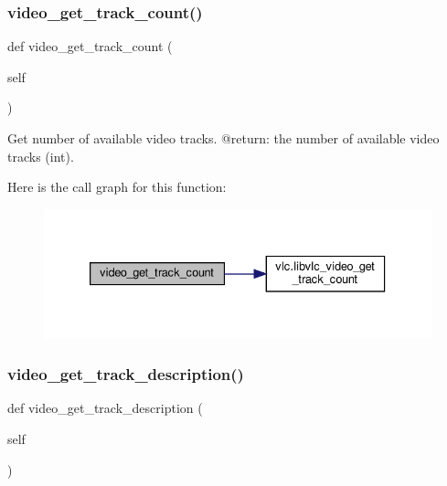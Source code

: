 \subsubsection{\texorpdfstring{video\+\_\+get\+\_\+track\+\_\+count()}{video\_get\_track\_count()}}
{\footnotesize\ttfamily def video\+\_\+get\+\_\+track\+\_\+count (\begin{DoxyParamCaption}\item[{}]{self }\end{DoxyParamCaption})}

\begin{DoxyVerb}Get number of available video tracks.
@return: the number of available video tracks (int).
\end{DoxyVerb}
 Here is the call graph for this function\+:
\nopagebreak
\begin{figure}[H]
\begin{center}
\leavevmode
\includegraphics[width=333pt]{classvlc_1_1_media_player_a2fbaacd793c681e340c5b62022e60f0b_cgraph}
\end{center}
\end{figure}
\mbox{\label{classvlc_1_1_media_player_a93127aa157b1e8d516c2a2dd8c77db21}} 
\subsubsection{\texorpdfstring{video\+\_\+get\+\_\+track\+\_\+description()}{video\_get\_track\_description()}}
{\footnotesize\ttfamily def video\+\_\+get\+\_\+track\+\_\+description (\begin{DoxyParamCaption}\item[{}]{self }\end{DoxyParamCaption})}

